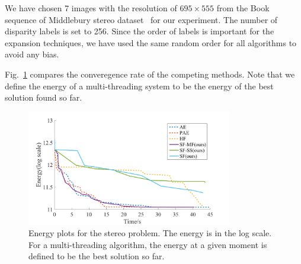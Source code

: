
\noindent We have chosen 7 images with the resolution of $695\times555$
from the Book sequence of Middlebury stereo dataset~\cite{middlebury_stereo} for our
experiment. The number of disparity labels is
set to 256.
%
Since the order of labels is important for the expansion techniques,
we have used the same random order for all algorithms to avoid any
bias.
%

Fig.~\ref{fig:stereo_global} compares the converegence rate of the
competing methods. Note that we define the energy of a multi-threading
system to be the energy of the best solution found so far.
%

\begin{figure}[tb]
\centering
\includegraphics[width=0.8\textwidth]{figure/stereo_global.png}
\caption{Energy plots for the stereo problem. The energy is in the log
scale. For a multi-threading algorithm, the energy at a given moment is
defined to be the best solution so far.}
\label{fig:stereo_global}
\end{figure}
%

